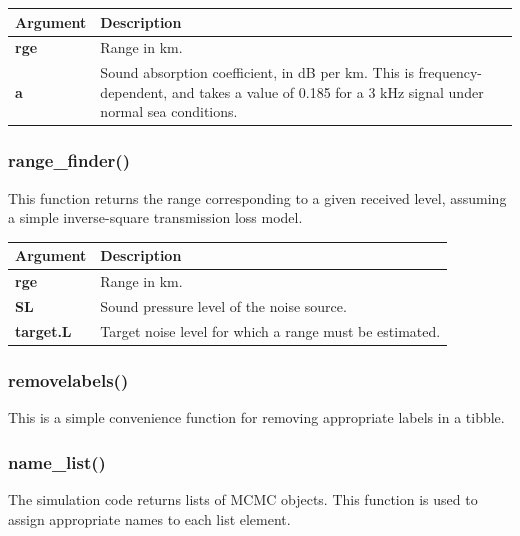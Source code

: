 \documentclass[
]{article}
\begin{document}
\renewcommand{\arraystretch}{1.4}
\begin{table}[H]
\centering
\begin{tabular}{>{\bfseries}l|>{\raggedright\arraybackslash}p{30em}}
\toprule
\textbf{Argument} & \textbf{Description}\\
\midrule
rge & Range in km.\\
a & Sound absorption coefficient, in dB per km. This is frequency-dependent, and takes a value of 0.185 for a 3 kHz signal under normal sea conditions.\\
\bottomrule
\end{tabular}
\end{table}

\subsubsection{range\_finder()}

This function returns the range corresponding to a given received level, assuming a simple inverse-square transmission loss model.

\renewcommand{\arraystretch}{1.4}
\begin{table}[H]
\centering
\begin{tabular}{>{\bfseries}l|>{\raggedright\arraybackslash}p{30em}}
\toprule
\textbf{Argument} & \textbf{Description}\\
\midrule
rge & Range in km.\\
SL & Sound pressure level of the noise source.\\
target.L & Target noise level for which a range must be estimated.\\
\bottomrule
\end{tabular}
\end{table}

\subsubsection{removelabels()}

This is a simple convenience function for removing appropriate labels in a tibble.

\subsubsection{name\_list()}

The simulation code returns lists of MCMC objects. This function is used to assign appropriate names to each list element.
\end{document}
